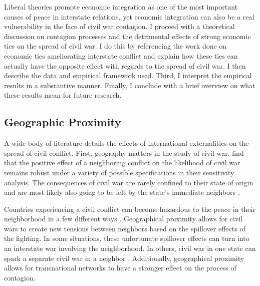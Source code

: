 \documentclass[12pt,letterpaper]{article}
\begin{document}
Liberal theories promote economic integration as one of the most important causes of peace in interstate relations, yet economic integration can also be a real vulnerability in the face of civil war contagion. I proceed with a theoretical discussion on contagion processes and the detrimental effects of strong economic ties on the spread of civil war. I do this by referencing the work done on economic ties ameliorating interstate conflict and explain how these ties can actually have the opposite effect with regards to the spread of civil war. I then describe the data and empirical framework used. Third, I interpret the empirical results in a substantive manner. Finally, I conclude with a brief overview on what these results mean for future research.  

\subsection*{Geographic Proximity}
A wide body of literature details the effects of international externalities on the spread of civil conflict. First, geography matters in the study of civil war. \citet{HegreSambanis2006} find that the positive effect of a neighboring conflict on the likelihood of civil war remains robust under a variety of possible specifications in their sensitivity analysis. The consequences of civil war are rarely confined to their state of origin and are most likely also going to be felt by the state's immediate neighbors \citep{Kathman2002b, MurdochSandler2002, Beardsley2011}. 

Countries experiencing a civil conflict can become hazardous to the peace in their neighborhood in a few different ways \citep{BuhaugGleditsch2008, MurdochSandler2002, MurdochSandler2004, Gleditsch2007, Schultz2010, GleditschSalehyanSchultz2008, Beardsley2011}. Geographical proximity allows for civil wars to create new tensions between neighbors based on the spillover effects of the fighting. In some situations, these unfortunate spillover effects can turn into an interstate war involving the neighborhood. In others, civil war in one state can spark a separate civil war in a neighbor \citep{GleditschSalehyanSchultz2008}. Additionally, geographical proximity allows for transnational networks to have a stronger effect on the process of contagion.
\end{document}
